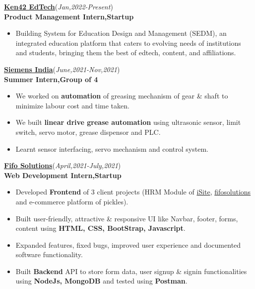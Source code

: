 \documentclass[10pt]{extarticle}
\begin{document}
\vspace{1pt}
\href{https://www.linkedin.com/company/ken42/}{\textbf{Ken42 EdTech}}\hfill\hfill(\textit{Jan,2022-Present})\\
\textbf{Product Management Intern,Startup}
    \begin{itemize}
       \item Building System for Education Design and Management (SEDM), an integrated education platform that caters to evolving needs of institutions and students, bringing them the best of edtech, content, and affiliations. 
    \end{itemize}
\vspace{5pt}
\href{https://github.com/PSoni8/Siemens-2021-2022-Internship}{\textbf{Siemens India}}\hfill\hfill(\textit{June,2021-Nov,2021})\\
\textbf{Summer Intern,Group of 4}
     \begin{itemize}
         \item We worked on \textbf{automation} of greasing mechanism of gear \& shaft to minimize labour cost and time taken.
         \item We built \textbf{linear drive grease automation} using ultrasonic sensor, limit switch, servo motor, grease dispensor and PLC. 
         \item Learnt sensor interfacing, servo mechanism and control system.
     \end{itemize}
\vspace{5pt}
\href{https://github.com/PSoni8/FIFO-Solutions-Internship}{\textbf{Fifo Solutions}}\hfill\hfill(\textit{April,2021-July,2021})\\
\textbf{Web Development Intern,Startup}
    \begin{itemize}
        \item Developed \textbf{Frontend} of 3 client projects (HRM Module of \href{https://isiteinfo.com/}{iSite}, \href{https://www.fifosolutions.com/}{fifosolutions} and e-commerce platform of pickles).
        \item Built user-friendly, attractive \& responsive UI like Navbar, footer, forms, content using \textbf{HTML, CSS, BootStrap, Javascript}.
        \item Expanded features, fixed bugs, improved user experience and documented software functionality.
        \item Built \textbf{Backend} API to store form data, user signup \& signin functionalities using \textbf{NodeJs, MongoDB} and tested using \textbf{Postman}.
    \end{itemize}
\end{document}
